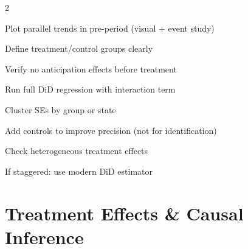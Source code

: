 \documentclass[10pt,a4paper]{article}
\begin{document}
\begin{tcolorbox}[checklist]
\begin{multicols}{2}
\begin{checklist}
  \item Plot parallel trends in pre-period (visual + event study)
  \item Define treatment/control groups clearly
  \item Verify no anticipation effects before treatment
  \item Run full DiD regression with interaction term
  \item Cluster SEs by group or state
  \item Add controls to improve precision (not for identification)
  \item Check heterogeneous treatment effects
  \item If staggered: use modern DiD estimator
\end{checklist}
\end{multicols}
\end{tcolorbox}

\section{Treatment Effects \& Causal Inference}
\end{document}
